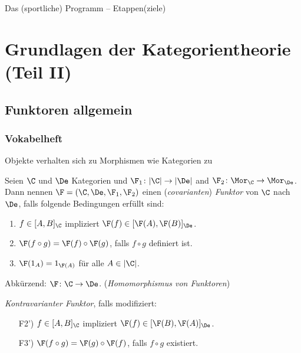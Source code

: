 \documentclass[serif,9pt]{beamer}
\begin{document}
\maketitle

\begin{frame}{Das (sportliche) Programm -- Etappen(ziele)}
  \tableofcontents
\end{frame}


\section{Grundlagen der Kategorientheorie (Teil II)}

\subsection{Funktoren allgemein}

\begin{frame}
  \frametitle{Vokabelheft}
  Objekte verhalten sich zu Morphismen wie
  Kategorien zu 
  \pause
  \begin{defn*}
  Seien $\C$ und $\De$ Kategorien und $\F_1 \colon |\C| \to |\De|$ and $\F_2 \colon \Mor_\C\to \Mor_\De$. 
  Dann nennen $\F = (\C, \De, \F_1, \F_2)$ einen (\emph{covarianten}) \emph{Funktor} von $\C$ nach $\De$, falls folgende Bedingungen erfüllt sind:
  \begin{enumerate}[F1)]
    \item $f \in [A, B]_\C$ impliziert $\F(f) \in [\F(A), \F(B)]_\De$.
    \item $\F(f \circ g) = \F(f) \circ \F(g)$, falls $f \circ g$ definiert ist.
    \item $\F(1_A) = 1_{\F(A)}$ für alle $A \in |\C|$.
  \end{enumerate}
  Abkürzend: $\F \colon \C \to \De$. (\emph{Homomorphismus von Funktoren})

  \pause

  \emph{Kontravarianter Funktor}, falls modifiziert:
\begin{enumerate}[F1')]
  \item[F2')] $f \in [A, B]_\C$ impliziert $\F(f) \in [\F(B), \F(A)]_\De$.
  \item[F3')] $\F(f \circ g) = \F(g) \circ \F(f)$, falls $f \circ g$ existiert.
\end{enumerate}
  \end{defn*}
\end{frame}
\end{document}
